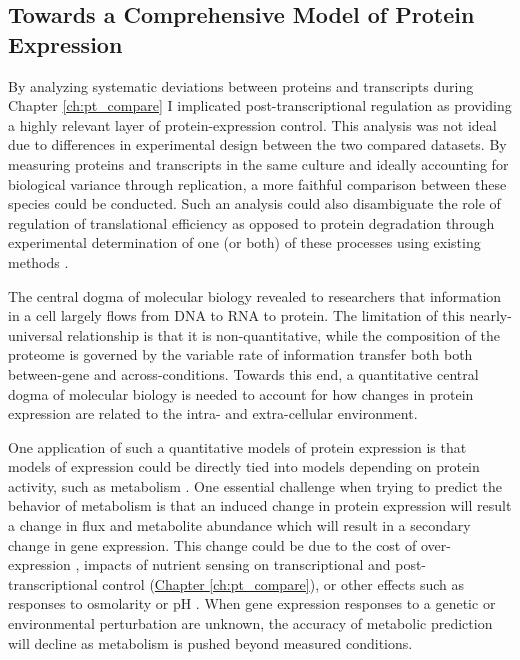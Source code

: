 \subsection{Towards a Comprehensive Model of Protein Expression}

By analyzing systematic deviations between proteins and transcripts during Chapter \ref{ch:pt_compare} I implicated post-transcriptional regulation as providing a highly relevant layer of protein-expression control. This analysis was not ideal due to differences in experimental design between the two compared datasets. By measuring proteins and transcripts in the same culture and ideally accounting for biological variance through replication, a more faithful comparison between these species could be conducted.  Such an analysis could also disambiguate the role of regulation of translational efficiency as opposed to protein degradation through experimental determination of one (or both) of these processes using existing methods \cite{Ingolia:2009dp, Belle:2006hv}.

The central dogma of molecular biology revealed to researchers that information in a cell largely flows from DNA to RNA to protein. The limitation of this nearly-universal relationship is that it is non-quantitative, while the composition of the proteome is governed by the variable rate of information transfer both both between-gene and across-conditions. Towards this end, a quantitative central dogma of molecular biology is needed to account for how changes in protein expression are related to the intra- and extra-cellular environment.

One application of such a quantitative models of protein expression is that models of expression could be directly tied into models depending on protein activity, such as metabolism \cite{OBrien:2013fl}.  One essential challenge when trying to predict the behavior of metabolism is that an induced change in protein expression will result a change in flux and metabolite abundance which will result in a secondary change in gene expression. This change could be due to the cost of over-expression \cite{Dykhuizen:1987uq}, impacts of nutrient sensing on transcriptional \cite{Brauer:2008jn} and post-transcriptional control (\hyperref[ch:pt_compare]{Chapter \ref{ch:pt_compare}}), or other effects such as responses to osmolarity or pH \cite{Csonka:1991wf}. When gene expression responses to a genetic or environmental perturbation are unknown, the accuracy of metabolic prediction will decline as metabolism is pushed beyond measured conditions.

